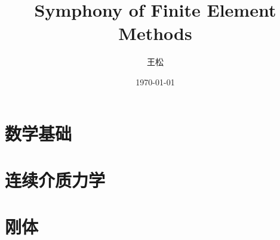\documentclass[lang=cn,newtx,10pt,scheme=chinese]{elegantbook}
\title{Symphony of Finite Element Methods}
\author{王松}
\date{\today}
\begin{document}
\maketitle
\frontmatter

\tableofcontents

\mainmatter

\part{数学基础}

\part{连续介质力学}

\part{刚体}
\end{document}
